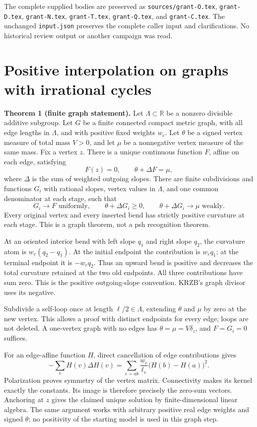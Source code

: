 \documentclass[
  11pt,
]{article}
\begin{document}
The complete supplied bodies are preserved as
\texttt{sources/grant-O.tex}, \texttt{grant-D.tex},
\texttt{grant-N.tex}, \texttt{grant-T.tex}, \texttt{grant-Q.tex}, and
\texttt{grant-C.tex}. The unchanged \texttt{input.json} preserves the
complete caller input and clarifications. No historical review output or
another campaign was read.

\section{Positive interpolation on graphs with irrational
cycles}\label{positive-interpolation-on-graphs-with-irrational-cycles}

\textbf{Theorem 1 (finite graph statement).} Let
\(\Lambda\subset\mathbb R\) be a nonzero divisible additive subgroup.
Let \(G\) be a finite connected compact metric graph, with all edge
lengths in \(\Lambda\), and with positive fixed weights \(w_e\). Let
\(\theta\) be a signed vertex measure of total mass \(V>0\), and let
\(\mu\) be a nonnegative vertex measure of the same mass. Fix a vertex
\(z\). There is a unique continuous function \(F\), affine on each edge,
satisfying \[
 F(z)=0,\qquad \theta+\Delta F=\mu,
\] where \(\Delta\) is the sum of weighted outgoing slopes. There are
finite subdivisions and functions \(G_i\) with rational slopes, vertex
values in \(\Lambda\), and one common denominator at each stage, such
that \[
 G_i\longrightarrow F\text{ uniformly},\qquad
 \theta+\Delta G_i\geq0,\qquad
 \theta+\Delta G_i\longrightarrow\mu\text{ weakly}.
\] Every original vertex and every inserted bend has strictly positive
curvature at each stage. This is a graph theorem, not a psh recognition
theorem.

At an oriented interior bend with left slope \(q_1\) and right slope
\(q_2\), the curvature atom is \(w_e(q_2-q_1)\). At the initial endpoint
the contribution is \(w_eq_1\); at the terminal endpoint it is
\(-w_eq_2\). Thus an upward bend is positive and decreases the total
curvature retained at the two old endpoints. All three contributions
have sum zero. This is the positive outgoing-slope convention. KRZB's
graph divisor uses its negative.

Subdivide a self-loop once at length \(\ell/2\in\Lambda\), extending
\(\theta\) and \(\mu\) by zero at the new vertex. This allows a proof
with distinct endpoints for every edge; loops are not deleted. A
one-vertex graph with no edges has \(\theta=\mu=V\delta_z\), and
\(F=G_i=0\) suffices.

For an edge-affine function \(H\), direct cancellation of edge
contributions gives \[
 -\sum_vH(v)\Delta H(v)=\sum_{e=ab}\frac{w_e}{\ell_e}\bigl(H(b)-H(a)\bigr)^2.
\] Polarization proves symmetry of the vertex matrix. Connectivity makes
its kernel exactly the constants. Its image is therefore precisely the
zero-sum vectors. Anchoring at \(z\) gives the claimed unique solution
by finite-dimensional linear algebra. The same argument works with
arbitrary positive real edge weights and signed \(\theta\); no
positivity of the starting model is used in this graph step.
\end{document}
